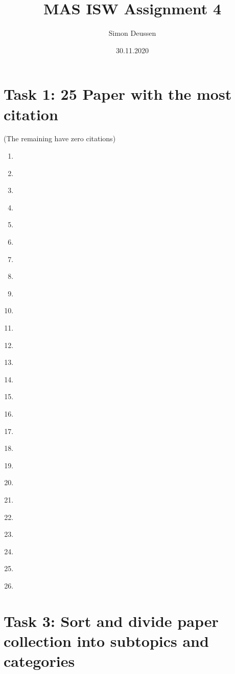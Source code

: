 \documentclass{article}
\title{MAS ISW Assignment 4}
\date{30.11.2020}
\author{Simon Deussen}
\begin{document}
  \maketitle

  \section*{Task 1: 25 Paper with the most citation}
  (The remaining have zero citations)
  \begin{enumerate}
    \item \cite{Derrac2011}
    \item \cite{Mavrovouniotis2017}
    \item \cite{Lynn2015}
    \item \cite{Bechar2016}
    \item \cite{Weiss2011}
    \item \cite{Pedersen2006}
    \item \cite{Konur2012}
    \item \cite{Schneider2003}
    \item \cite{Winfield2008}
    \item \cite{Chung2018}
    \item \cite{Vasconez2019}
    \item \cite{Roldan2016}
    \item \cite{Liu2006} 
    \item \cite{Vigelius2014}
    \item \cite{Ball2015}
    \item \cite{VillaHenriksen2020}
    \item \cite{CORTES2017}
    \item \cite{Oberti2016}
    \item \cite{Innocente2019}
    \item \cite{Din2018}
    \item \cite{Gao2018}
    \item \cite{Fu2020}
    \item \cite{Jones2019}
    \item \cite{Miner2007}
    \item \cite{Osaba2020}
    \item \cite{Herck2020}
  \end{enumerate}

  \section*{Task 3: Sort and divide paper collection into subtopics and categories}
\end{document}
